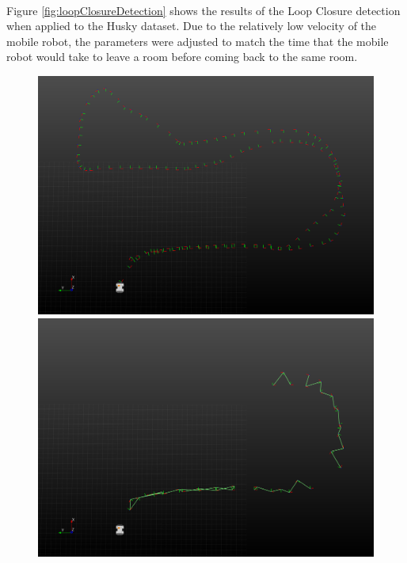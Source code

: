 \documentclass[11pt]{article}
\begin{document}
	\paragraph{}
	Figure \ref{fig:loopClosureDetection} shows the results of the Loop Closure detection when applied to the Husky dataset. Due to the relatively low velocity of the mobile robot, the parameters were adjusted to match the time that the mobile robot would take to leave a room before coming back to the same room.
	\begin{figure}
	\begin{minipage}{0.67\textwidth}
				\centering
				\includegraphics[width=\textwidth]{LoopClosureTimeSampling}
				\includegraphics[width=\textwidth]{LoopClosureEuclideanSampling}

\end{minipage}
\end{figure}
\end{document}
